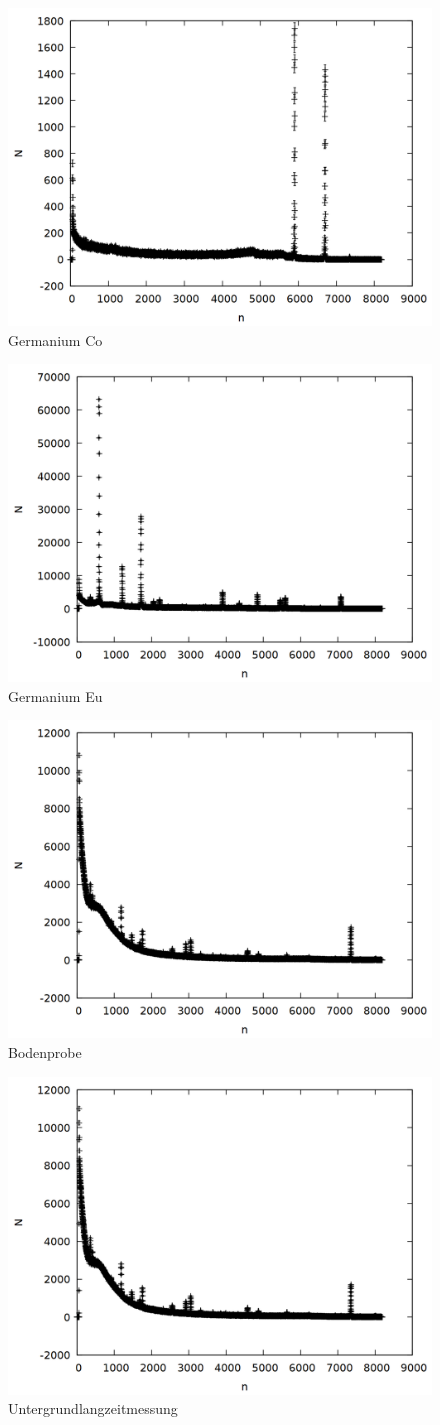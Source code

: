 \begin{figure}
\centering
\includegraphics[width=0.7\linewidth]{data/ge_co_raw.png}
\caption{Germanium Co}
\end{figure}

\begin{figure}
\centering
\includegraphics[width=0.7\linewidth]{data/ge_eu_raw.png}
\caption{Germanium Eu}
\end{figure}

\begin{figure}
\centering
\includegraphics[width=0.7\linewidth]{data/erde_raw.png}
\caption{Bodenprobe}
\end{figure}

\begin{figure}
\centering
\includegraphics[width=0.7\linewidth]{data/untergrund.png}
\caption{Untergrundlangzeitmessung}
\end{figure}
